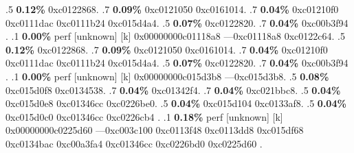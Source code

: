 \begin{profile}
{.5 \textbf{0.12\%} 0xc0122868. 
.7 \textbf{0.09\%} 0xc0121050\newline {} 0xc0161014. 
.7 \textbf{0.04\%} 0xc01210f0\newline {} 0xc0111dac\newline {} 0xc0111b24\newline {} 0xc015d4a4. 
.5 \textbf{0.07\%} 0xc0122820. 
.7 \textbf{0.04\%} 0xc00b3f94\newline {} . 
.1 \textbf{ 0.00\%} perf             [unknown]              [k] 0x00000000c01118a8\newline {} ---0xc01118a8\newline {} 0xc0122c64. 
.5 \textbf{0.12\%} 0xc0122868. 
.7 \textbf{0.09\%} 0xc0121050\newline {} 0xc0161014. 
.7 \textbf{0.04\%} 0xc01210f0\newline {} 0xc0111dac\newline {} 0xc0111b24\newline {} 0xc015d4a4. 
.5 \textbf{0.07\%} 0xc0122820. 
.7 \textbf{0.04\%} 0xc00b3f94\newline {} . 
.1 \textbf{ 0.00\%} perf             [unknown]              [k] 0x00000000c015d3b8\newline {} ---0xc015d3b8. 
.5 \textbf{0.08\%} 0xc015d0f8\newline {} 0xc0134538. 
.7 \textbf{0.04\%} 0xc01342f4. 
.7 \textbf{0.04\%} 0xc021bbc8. 
.5 \textbf{0.04\%} 0xc015d0e8\newline {} 0xc01346cc\newline {} 0xc0226be0. 
.5 \textbf{0.04\%} 0xc015d104\newline {} 0xc0133af8. 
.5 \textbf{0.04\%} 0xc015d0c0\newline {} 0xc01346cc\newline {} 0xc0226cb4\newline {} . 
.1 \textbf{ 0.18\%} perf             [unknown]              [k] 0x00000000c0225d60\newline {} ---0xc003c100\newline {} 0xc0113f48\newline {} 0xc0113dd8\newline {} 0xc015df68\newline {} 0xc0134bac\newline {} 0xc00a3fa4\newline {} 0xc01346cc\newline {} 0xc0226bd0\newline {} 0xc0225d60\newline {} . 
}
\end{profile}
